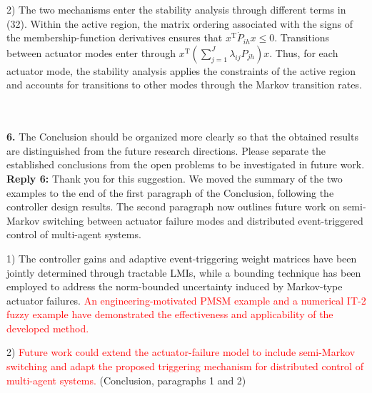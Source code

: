 \documentclass[10pt,fleqn]{article}
\begin{document}
2) The two mechanisms enter the stability analysis through different terms in (32). Within the active region, the matrix ordering associated with the signs of the membership-function derivatives ensures that $x^{\mathrm T}\dot P_{ih}x\leq 0$. Transitions between actuator modes enter through $x^{\mathrm T}(\sum_{j=1}^{J}\lambda_{ij}P_{jh})x$. Thus, for each actuator mode, the stability analysis applies the constraints of the active region and accounts for transitions to other modes through the Markov transition rates.

~\\
\\
\textbf{6.} The Conclusion should be organized more clearly so that the obtained results are distinguished from the future research directions. Please separate the established conclusions from the open problems to be investigated in future work.
\\[10pt]
\begingroup
\setlength{\parskip}{6pt}
\indent \textbf{Reply 6:} Thank you for this suggestion. We moved the summary of the two examples to the end of the first paragraph of the Conclusion, following the controller design results. The second paragraph now outlines future work on semi-Markov switching between actuator failure modes and distributed event-triggered control of multi-agent systems.\par
1) The controller gains and adaptive event-triggering weight matrices have been jointly determined through tractable LMIs, while a bounding technique has been employed to address the norm-bounded uncertainty induced by Markov-type actuator failures. \textcolor{red}{An engineering-motivated PMSM example and a numerical IT-2 fuzzy example have demonstrated the effectiveness and applicability of the developed method.}\par
\begingroup
{}
2) \textcolor{red}{Future work could extend the actuator-failure model to include semi-Markov switching and adapt the proposed triggering mechanism for distributed control of multi-agent systems.} (Conclusion, paragraphs 1 and 2)\par
\endgroup
\endgroup
\end{document}
